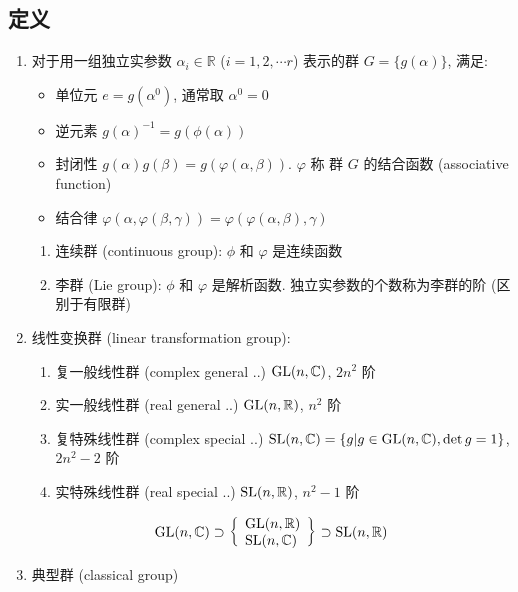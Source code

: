 \documentclass[12pt,a4paper]{article}%
\numberwithin{equation}{section}%
\begin{document}
\subsection{定义} %
\label{sub:lie_def}
\begin{enumerate}
	\item 对于用一组独立实参数 $\alpha_i\in\mathbb R$ ($i = 1,2,\cdots r$) 表示的群 $G = \{g(\alpha)\}$, 满足:
	\begin{itemize}
		\item 单位元 $e = g(\alpha^0) $, 通常取 $\alpha^0 = 0$
		\item 逆元素 $g(\alpha)^{-1} = g(\phi(\alpha))$
		\item 封闭性 $g(\alpha)g(\beta) = g(\varphi(\alpha,\beta))$. $\varphi$ 称 群 $G$ 的结合函数 (associative function)
		\item 结合律 $\varphi(\alpha,\varphi(\beta,\gamma)) = \varphi(\varphi(\alpha,\beta),\gamma)$
	\end{itemize}
	\begin{enumerate}
		\item 连续群 (continuous group): $\phi$ 和 $\varphi$ 是连续函数
		\item 李群 (Lie group): $\phi$ 和 $\varphi$ 是解析函数. 独立实参数的个数称为李群的阶 (区别于有限群)
	\end{enumerate}
	\item 线性变换群 (linear transformation group): 
	\begin{enumerate}
		\item 复一般线性群 (complex general ..) $\mathrm{GL}(n,\mathbb C)$, $2n^2$ 阶
		\item 实一般线性群 (real general ..) $\mathrm{GL}(n,\mathbb R)$, $n^2$ 阶
		\item 复特殊线性群 (complex special ..) $\mathrm{SL}(n,\mathbb C) = \{g|g\in\mathrm{GL}(n,\mathbb C), \det g = 1\}$, $2n^2-2$ 阶
		\item 实特殊线性群 (real special ..) $\mathrm{SL}(n,\mathbb R)$, $n^2-1$ 阶
	\end{enumerate}
	\begin{equation}
		\mathrm{GL}(n,\mathbb C)\supset\left\{\begin{array}{l}
			\mathrm{GL}(n,\mathbb R) \\
			\mathrm{SL}(n,\mathbb C)
		\end{array}\right\}\supset \mathrm{SL}(n,\mathbb R)
	\end{equation}
	\item 典型群 (classical group)
	\begin{enumerate}

\end{enumerate}
\end{enumerate}
\end{document}
